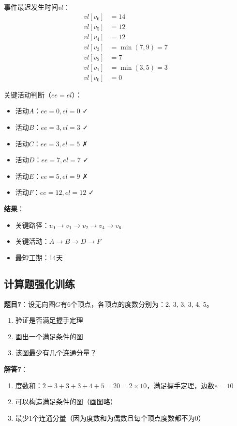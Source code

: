 \documentclass[12pt,a4paper]{amsart}
\begin{document}
事件最迟发生时间$vl$：
\begin{align}
vl[v_6] &= 14 \\
vl[v_5] &= 12 \\
vl[v_4] &= 12 \\
vl[v_3] &= \min(7, 9) = 7 \\
vl[v_2] &= 7 \\
vl[v_1] &= \min(3, 5) = 3 \\
vl[v_0] &= 0
\end{align}

关键活动判断（$ee = el$）：
\begin{itemize}
    \item 活动$A$：$ee = 0, el = 0$ ✓
    \item 活动$B$：$ee = 3, el = 3$ ✓
    \item 活动$C$：$ee = 3, el = 5$ ✗
    \item 活动$D$：$ee = 7, el = 7$ ✓
    \item 活动$E$：$ee = 5, el = 9$ ✗
    \item 活动$F$：$ee = 12, el = 12$ ✓
\end{itemize}

\textbf{结果}：
\begin{itemize}
    \item 关键路径：$v_0 \rightarrow v_1 \rightarrow v_2 \rightarrow v_4 \rightarrow v_6$
    \item 关键活动：$A \rightarrow B \rightarrow D \rightarrow F$
    \item 最短工期：14天
\end{itemize}

\subsection{计算题强化训练}

\textbf{题目7}：设无向图$G$有6个顶点，各顶点的度数分别为：2, 3, 3, 3, 4, 5。
\begin{enumerate}
    \item 验证是否满足握手定理
    \item 画出一个满足条件的图
    \item 该图最少有几个连通分量？
\end{enumerate}

\textbf{解答7}：
\begin{enumerate}
    \item 度数和：$2 + 3 + 3 + 3 + 4 + 5 = 20 = 2 \times 10$，满足握手定理，边数$e = 10$
    \item 可以构造满足条件的图（画图略）
    \item 最少1个连通分量（因为度数和为偶数且每个顶点度数都不为0）
\end{enumerate}
\end{document}

